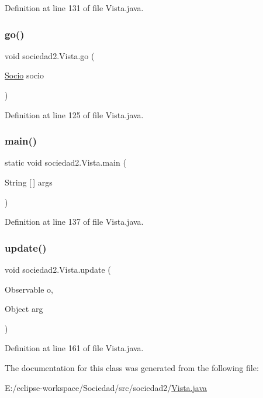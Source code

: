 Definition at line 131 of file Vista.\+java.

\mbox{\label{classsociedad2_1_1_vista_a103a6cd3dba96b73a7ce663d8c91dce6}} 
\subsubsection{\texorpdfstring{go()}{go()}}
{\footnotesize\ttfamily void sociedad2.\+Vista.\+go (\begin{DoxyParamCaption}\item[{\mbox{\hyperlink{classsociedad2_1_1_socio}{Socio}}}]{socio }\end{DoxyParamCaption})}



Definition at line 125 of file Vista.\+java.

\mbox{\label{classsociedad2_1_1_vista_a9d4ba8e7d2fc1e8f48374eb484ddb76c}} 
\subsubsection{\texorpdfstring{main()}{main()}}
{\footnotesize\ttfamily static void sociedad2.\+Vista.\+main (\begin{DoxyParamCaption}\item[{String \mbox{[}$\,$\mbox{]}}]{args }\end{DoxyParamCaption})\hspace{0.3cm}{\ttfamily [static]}}



Definition at line 137 of file Vista.\+java.

\mbox{\label{classsociedad2_1_1_vista_a48b32507f61975d72ef37f0ee69e5e5c}} 
\subsubsection{\texorpdfstring{update()}{update()}}
{\footnotesize\ttfamily void sociedad2.\+Vista.\+update (\begin{DoxyParamCaption}\item[{Observable}]{o,  }\item[{Object}]{arg }\end{DoxyParamCaption})}



Definition at line 161 of file Vista.\+java.



The documentation for this class was generated from the following file\+:\begin{DoxyCompactItemize}
\item 
E\+:/eclipse-\/workspace/\+Sociedad/src/sociedad2/\mbox{\hyperlink{_vista_8java}{Vista.\+java}}\end{DoxyCompactItemize}
